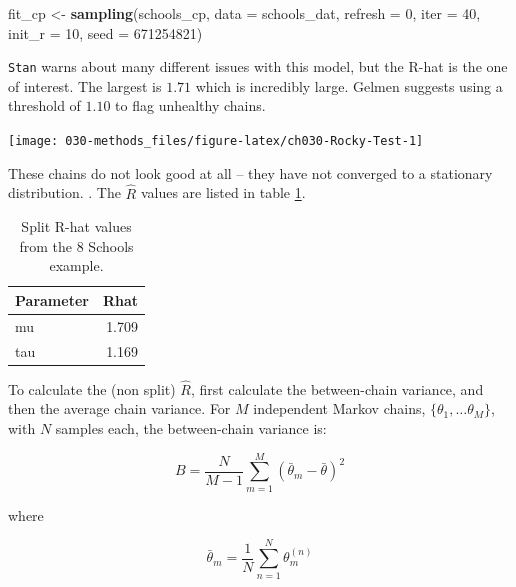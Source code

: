 \documentclass[11pt, oneside, openany]{scrbook}
\newenvironment{Shaded}{\begin{snugshade}}{\end{snugshade}}
\newcommand{\DataTypeTok}[1]{\textcolor[rgb]{0.13,0.29,0.53}{#1}}
\newcommand{\DecValTok}[1]{\textcolor[rgb]{0.00,0.00,0.81}{#1}}
\newcommand{\KeywordTok}[1]{\textcolor[rgb]{0.13,0.29,0.53}{\textbf{#1}}}
\newcommand{\NormalTok}[1]{#1}
\newcommand{\StringTok}[1]{\textcolor[rgb]{0.31,0.60,0.02}{#1}}
\begin{document}

\begin{Shaded}
\begin{Highlighting}[]
\NormalTok{fit_cp <-}\StringTok{ }\KeywordTok{sampling}\NormalTok{(schools_cp, }\DataTypeTok{data =}\NormalTok{ schools_dat, }\DataTypeTok{refresh =} \DecValTok{0}\NormalTok{,}
                   \DataTypeTok{iter =} \DecValTok{40}\NormalTok{, }\DataTypeTok{init_r =} \DecValTok{10}\NormalTok{, }\DataTypeTok{seed =} \DecValTok{671254821}\NormalTok{)}
\end{Highlighting}
\end{Shaded}


\texttt{Stan} warns about many different issues with this model, but the R-hat is the one of interest. The largest is \(1.71\) which is incredibly large. Gelmen suggests using a threshold of \(1.10\) to flag unhealthy chains.

\begin{center}\texttt{[image: 030-methods\_files/figure-latex/ch030-Rocky-Test-1]} \end{center}

These chains do not look good at all -- they have not converged to a stationary distribution. . The \(\hat{R}\) values are listed in table \ref{tab:ch030-Ninth-Finger}.

\begin{table}[!h]

\caption{\label{tab:ch030-Ninth-Finger}Split R-hat values from the 8 Schools example.}
\centering
\begin{tabular}[t]{lr}
\toprule
Parameter & Rhat\\
\midrule
mu & 1.709\\
tau & 1.169\\
\bottomrule
\end{tabular}
\end{table}

To calculate the (non split) \(\hat{R}\), first calculate the between-chain variance, and then the average chain variance. For \(M\) independent Markov chains, \(\{\theta_1, \ldots \theta_M\}\), with \(N\) samples each, the between-chain variance is:


\[
B = \frac{N}{M-1}\sum_{m=1}^{M}\left(\bar{\theta}_m - \bar{\theta}\right)^2
\]

where

\[
\bar{\theta}_m = \frac{1}{N}\sum_{n=1}^{N}\theta_{m}^{(n)}
\]
\end{document}
